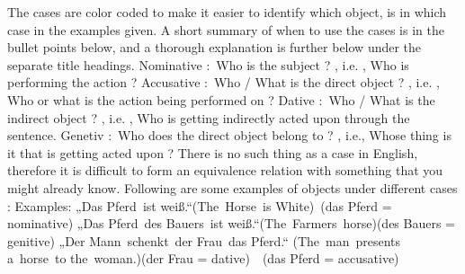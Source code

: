 \documentclass[a4paper,12pt]{article}
\begin{document}
The cases are color coded to make it easier to identify which object, is in
which case in the examples given.
A short summary of when to use the cases is in the bullet points below, and a
thorough explanation is further below under the separate title headings.
Nominative : Who is the subject ? , i.e. , Who is performing the action ?
Accusative : Who / What is the direct object ? , i.e. , Who or what is the
action being performed on ?
Dative : Who / What is the indirect object ? , i.e. , Who is getting indirectly
acted upon through the sentence.
Genetiv : Who does the direct object belong to ? , i.e., Whose thing is it that
is getting acted upon ?
There is no such thing as a case in English, therefore it is difficult to form
an equivalence relation with something that you might already know.
Following are some examples of objects under different cases :
Examples:
„Das Pferd ist weiß.“(The Horse is White) (das Pferd = nominative)
„Das Pferd des Bauers ist weiß.“(The Farmers horse)(des Bauers = genitive)
„Der Mann schenkt der Frau das Pferd.“ (The man presents a horse to
the woman.)(der Frau = dative)  (das Pferd = accusative)


\end{document}
